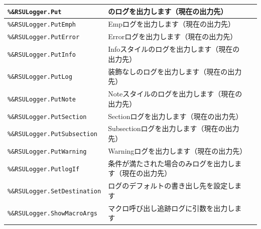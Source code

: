 \begin{center}
{\begin{xltabular}{\textwidth}{|p{4truecm}|X|p{1.2truecm}|}
\hline
\texttt{\%\&RSULogger.Put}&のログを出力します（現在の出力先）&\\
\hline
\texttt{\%\&RSULogger.PutEmph}&Empログを出力します（現在の出力先）&\\
\hline
\texttt{\%\&RSULogger.PutError}&Errorログを出力します（現在の出力先）&\\
\hline
\texttt{\%\&RSULogger.PutInfo}&Infoスタイルのログを出力します（現在の出力先）&\\
\hline
\texttt{\%\&RSULogger.PutLog}&装飾なしのログを出力します（現在の出力先）&\\
\hline
\texttt{\%\&RSULogger.PutNote}&Noteスタイルのログを出力します（現在の出力先）&\\
\hline
\texttt{\%\&RSULogger.PutSection}&Sectionログを出力します（現在の出力先）&\\
\hline
\texttt{\%\&RSULogger.PutSubsection}&Subsectionログを出力します（現在の出力先）&\\
\hline
\texttt{\%\&RSULogger.PutWarning}&Warningログを出力します（現在の出力先）&\\
\hline
\texttt{\%\&RSULogger.PutlogIf}&条件が満たされた場合のみログを出力します（現在の出力先）&\\
\hline
\texttt{\%\&RSULogger.SetDestination}&ログのデフォルトの書き出し先を設定します&\\
\hline
\texttt{\%\&RSULogger.ShowMacroArgs}&マクロ呼び出し追跡ログに引数を出力します&\\
\hline
\end{xltabular}
}
\end{center}
